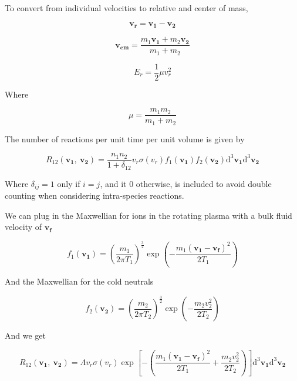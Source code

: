 \documentclass[11pt]{article}
\begin{document}
To convert from individual velocities to relative and center of mass,

\begin{equation}
	\mathbf{v_r} = \mathbf{v_1} - \mathbf{v_2}
\end{equation}

\begin{equation}
	\mathbf{v_{cm}} = \frac{m_1 \mathbf{v_1} + m_2 \mathbf{v_2}}{m_1 + m_2}
\end{equation}

\begin{equation}
	E_r = \frac{1}{2} \mu v_r^2
\end{equation}

Where

\begin{equation}
	\mu = \frac{m_1 m_2}{m_1 + m_2}
\end{equation}

The number of reactions per unit time per unit volume is given by 

\begin{equation}
	R_{12} (\mathbf{v_1},\ \mathbf{v_2}) = \frac{n_1 n_2}{1 + \delta_{12}} v_r \sigma(v_r) f_1(\mathbf{v_1}) f_2(\mathbf{v_2}) \mathrm{d}^3 \mathbf{v_1} \mathrm{d}^3 \mathbf{v_2}
\end{equation}

Where $\delta_{ij} = 1$ only if $i = j$, and it 0 otherwise, is included to avoid double counting when considering intra-species reactions.

We can plug in the Maxwellian for ions in the rotating plasma with a bulk fluid velocity of $\mathbf{v_f}$

\begin{equation}
	f_1(\mathbf{v_1}) = \left( \frac{m_1}{2 \pi T_1} \right)^{\frac{3}{2}} \exp \left( -\frac{m_1 (\mathbf{v_1} - \mathbf{v_f})^2}{2 T_1} \right)  
\end{equation}

And the Maxwellian for the cold neutrals

\begin{equation}
	f_2(\mathbf{v_2}) = \left( \frac{m_2}{2 \pi T_2} \right)^{\frac{3}{2}} \exp \left( -\frac{m_2 v_2^2}{2 T_2} \right)  
\end{equation}

And we get 

\begin{equation}
	R_{12} (\mathbf{v_1},\ \mathbf{v_2}) = \Lambda v_r \sigma(v_r) \exp \left[ -\left( \frac{m_1 (\mathbf{v_1} - \mathbf{v_f})^2}{2 T_1} + \frac{m_2 v_2^2}{2 T_2} \right) \right] \mathrm{d}^3 \mathbf{v_1} \mathrm{d}^3 \mathbf{v_2}
\end{equation}
\end{document}
